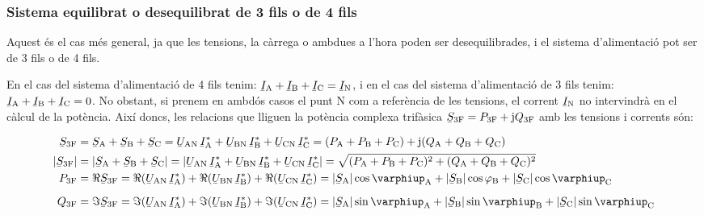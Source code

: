 \subsubsection{Sistema equilibrat o desequilibrat de 3 fils o de 4 fils}

Aquest és el cas més general, ja que les tensions, la càrrega o
ambdues a l'hora  poden ser desequilibrades, i el sistema
d'alimentació pot ser de 3 fils o de 4 fils.

En el cas del sistema d'alimentació de 4 fils tenim:
$\cmplx{I}\ped{A}+\cmplx{I}\ped{B}+\cmplx{I}\ped{C}=\cmplx{I}\ped{N}$, i
en el cas del sistema d'alimentació de 3 fils tenim:
$\cmplx{I}\ped{A}+\cmplx{I}\ped{B}+\cmplx{I}\ped{C}=0$. No obstant,
si prenem en ambdós casos el punt N com a referència de les
tensions, el corrent $\cmplx{I}\ped{N}$ no intervindrà en el càlcul de
la potència. Així doncs, les relacions que lliguen la potència
complexa trifàsica $\cmplx{S}\ped{3F} = P\ped{3F} + \ju Q\ped{3F}$
amb les tensions i corrents són:

\begin{align}
    \cmplx{S}\ped{3F} &= \cmplx{S}\ped{A} + \cmplx{S}\ped{B} + \cmplx{S}\ped{C} =
     \cmplx{U}\ped{AN}\, \cmplx{I}\ped{A}^* +
    \cmplx{U}\ped{BN} \,\cmplx{I}\ped{B}^* +  \cmplx{U}\ped{CN}\, \cmplx{I}\ped{C}^* =
    (P\ped{A} + P\ped{B} + P\ped{C}) + \ju (Q\ped{A} + Q\ped{B} + Q\ped{C}) \label{eq:s_3f} \\
    |\cmplx{S}\ped{3F}| &= |\cmplx{S}\ped{A} + \cmplx{S}\ped{B} + \cmplx{S}\ped{C}| =
    |\cmplx{U}\ped{AN}\, \cmplx{I}\ped{A}^* +
    \cmplx{U}\ped{BN} \,\cmplx{I}\ped{B}^* +  \cmplx{U}\ped{CN}\, \cmplx{I}\ped{C}^*| =
    \sqrt{(P\ped{A} + P\ped{B} + P\ped{C})^2 + (Q\ped{A} + Q\ped{B} + Q\ped{C})^2} \label{eq:s_3f_mod} \\
    P\ped{3F} &= \Re\cmplx{S}\ped{3F} = \Re(\cmplx{U}\ped{AN} \,\cmplx{I}\ped{A}^*) +
    \Re(\cmplx{U}\ped{BN} \,\cmplx{I}\ped{B}^*) +  \Re(\cmplx{U}\ped{CN}\,
    \cmplx{I}\ped{C}^*) = |\cmplx{S}\ped{A}| \cos \varphiup\ped{A} + |\cmplx{S}\ped{B}| \cos
    \varphi\ped{B} + |\cmplx{S}\ped{C}| \cos \varphiup\ped{C} \\[2mm]
    Q\ped{3F} &= \Im\cmplx{S}\ped{3F} = \Im(\cmplx{U}\ped{AN} \,\cmplx{I}\ped{A}^*) +
    \Im(\cmplx{U}\ped{BN} \,\cmplx{I}\ped{B}^*) +  \Im(\cmplx{U}\ped{CN}\,
    \cmplx{I}\ped{C}^*) = |\cmplx{S}\ped{A}| \sin \varphiup\ped{A} + |\cmplx{S}\ped{B}| \sin
    \varphiup\ped{B} + |\cmplx{S}\ped{C}| \sin \varphiup\ped{C}
\end{align}

